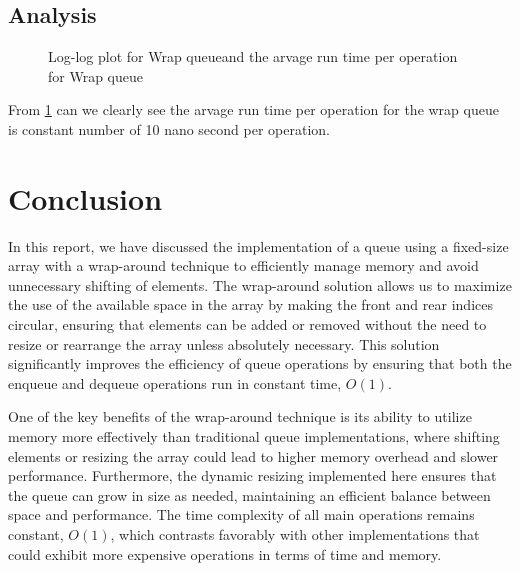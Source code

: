 \subsection*{Analysis}
\begin{figure}[h]
    \centering
    \caption{Log-log plot for Wrap queueand the arvage run time per operation for Wrap queue}
    \label{fig:wrap_linked_comparison}
\end{figure}
From \ref{fig:wrap_linked_comparison} can we clearly see the arvage run time per operation for the wrap queue is constant number of 10 nano second per operation.


\section*{Conclusion}
In this report, we have discussed the implementation of a queue using a fixed-size array with a wrap-around technique to efficiently manage memory and avoid unnecessary shifting of elements. The wrap-around solution allows us to maximize the use of the available space in the array by making the front and rear indices circular, ensuring that elements can be added or removed without the need to resize or rearrange the array unless absolutely necessary. This solution significantly improves the efficiency of queue operations by ensuring that both the enqueue and dequeue operations run in constant time, $O(1)$.

One of the key benefits of the wrap-around technique is its ability to utilize memory more effectively than traditional queue implementations, where shifting elements or resizing the array could lead to higher memory overhead and slower performance. Furthermore, the dynamic resizing implemented here ensures that the queue can grow in size as needed, maintaining an efficient balance between space and performance. The time complexity of all main operations remains constant, $O(1)$, which contrasts favorably with other implementations that could exhibit more expensive operations in terms of time and memory.

